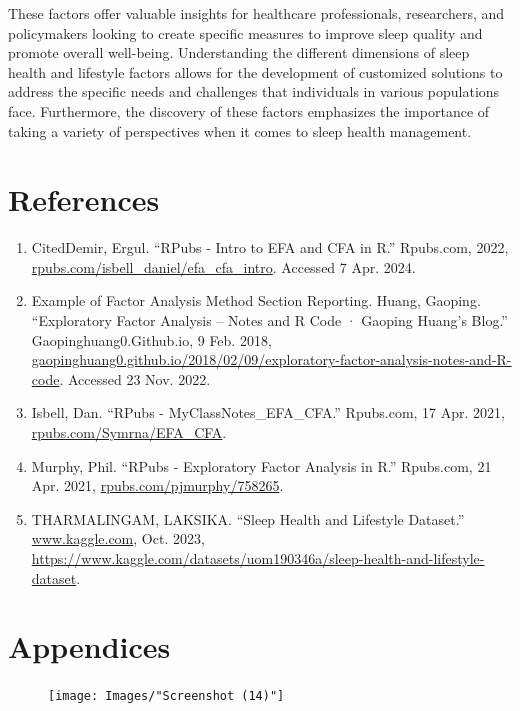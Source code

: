 \documentclass[11pt]{article}
\begin{document}
		These factors offer valuable insights for healthcare professionals, researchers, and policymakers looking to create specific measures to improve sleep quality and promote overall well-being. Understanding the different dimensions of sleep health and lifestyle factors allows for the development of customized solutions to address the specific needs and challenges that individuals in various populations face. Furthermore, the discovery of these factors emphasizes the importance of taking a variety of perspectives when it comes to sleep health management.
		
		\newpage
		\section{References}
		\begin{enumerate}
			\item CitedDemir, Ergul. “RPubs - Intro to EFA and CFA in R.” Rpubs.com, 2022, \url{rpubs.com/isbell_daniel/efa_cfa_intro}. Accessed 7 Apr. 2024.
			
			\item Example of Factor Analysis Method Section Reporting. Huang, Gaoping. “Exploratory Factor Analysis -- Notes and R Code · Gaoping Huang’s Blog.” Gaopinghuang0.Github.io, 9 Feb. 2018, \url{gaopinghuang0.github.io/2018/02/09/exploratory-factor-analysis-notes-and-R-code}. Accessed 23 Nov. 2022.
			
			\item Isbell, Dan. “RPubs - MyClassNotes\_EFA\_CFA.” Rpubs.com, 17 Apr. 2021, \url{rpubs.com/Symrna/EFA_CFA}.
			
			\item Murphy, Phil. “RPubs - Exploratory Factor Analysis in R.” Rpubs.com, 21 Apr. 2021, \url{rpubs.com/pjmurphy/758265}.
			
			\item THARMALINGAM, LAKSIKA. “Sleep Health and Lifestyle Dataset.” \url{www.kaggle.com}, Oct. 2023, \url{https://www.kaggle.com/datasets/uom190346a/sleep-health-and-lifestyle-dataset}.
		\end{enumerate}
		

		\section{Appendices}
		
			\begin{figure}[h]
				\texttt{[image: Images/"Screenshot (14)"]}
				\label{fig:r_code1}
			\end{figure}
			
\end{document}

